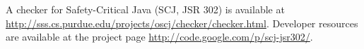 A checker for Safety-Critical Java (SCJ, JSR 302) is available at
\url{http://sss.cs.purdue.edu/projects/oscj/checker/checker.html}.
Developer resources are available at the project page
\url{http://code.google.com/p/scj-jsr302/}.






